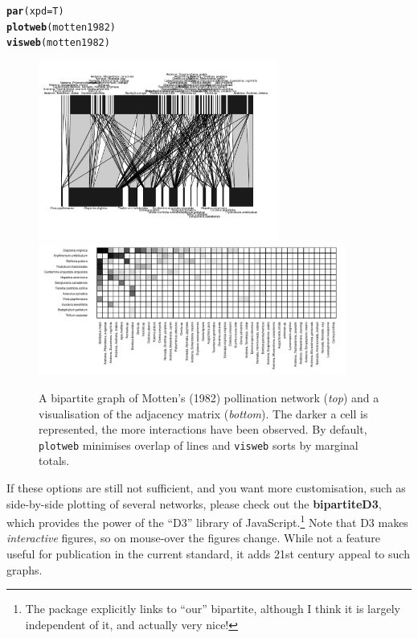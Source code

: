 \documentclass[a4paper, 11pt]{article}\usepackage[]{graphicx}\usepackage[]{color}
\makeatletter
\newcommand{\hlstd}[1]{\textcolor[rgb]{0.345,0.345,0.345}{#1}}%
\newcommand{\hlkwc}[1]{\textcolor[rgb]{0.333,0.667,0.333}{#1}}%
\newcommand{\hlkwd}[1]{\textcolor[rgb]{0.737,0.353,0.396}{\textbf{#1}}}%
\newenvironment{kframe}{%
 \def\at@end@of@kframe{}%
 \ifinner\ifhmode%
  \def\at@end@of@kframe{\end{minipage}}%
  \begin{minipage}{\columnwidth}%
 \fi\fi%
 \def\FrameCommand##1{\hskip\@totalleftmargin \hskip-\fboxsep
 \colorbox{shadecolor}{##1}\hskip-\fboxsep
     \hskip-\linewidth \hskip-\@totalleftmargin \hskip\columnwidth}%
 \MakeFramed {\advance\hsize-\width
   \@totalleftmargin\z@ \linewidth\hsize
   \@setminipage}}%
 {\par\unskip\endMakeFramed%
 \at@end@of@kframe}
\newenvironment{knitrout}{}{} %
\newcommand{\package}[1]{\textbf{#1}}
\makeatother
\begin{document}
\begin{knitrout}
\color{fgcolor}\begin{kframe}
\begin{alltt}
\hlkwd{par}\hlstd{(}\hlkwc{xpd}\hlstd{=T)}
\hlkwd{plotweb}\hlstd{(motten1982)}
\hlkwd{visweb}\hlstd{(motten1982)}
\end{alltt}
\end{kframe}
\end{knitrout}
%
%
\begin{figure}
\centering
	\includegraphics[width=0.7\textwidth]{figures/motten1982_plotweb}
	\smallskip
	\includegraphics[width=0.9\textwidth]{figures/motten1982_visweb}
	\caption{A bipartite graph of Motten's (1982) pollination network (\emph{top}) and a visualisation of the adjacency matrix (\emph{bottom}). The darker a cell is represented, the more interactions have been observed. By default, \texttt{plotweb} minimises overlap of lines and \texttt{visweb} sorts by marginal totals.}
	\label{fig:Amotten}
\end{figure}

If these options are still not sufficient, and you want more customisation, such as side-by-side plotting of several networks, please check out the \package{bipartiteD3}, which provides the power of the ``D3'' library of JavaScript.\footnote{The package explicitly links to ``our'' bipartite, although I think it is largely independent of it, and actually very nice!} Note that D3 makes \emph{interactive} figures, so on mouse-over the figures change. While not a feature useful for publication in the current standard, it adds 21st century appeal to such graphs.
\end{document}
